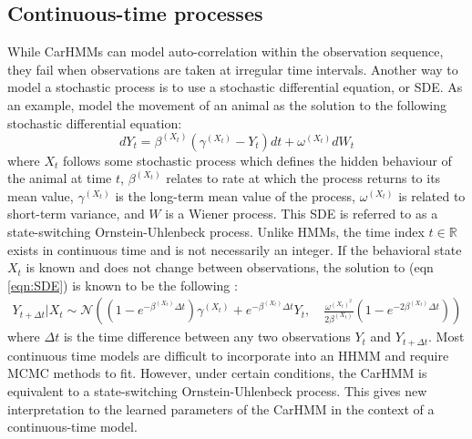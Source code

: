\subsection{Continuous-time processes}

While CarHMMs can model auto-correlation within the observation sequence, they fail when observations are taken at irregular time intervals. Another way to model a stochastic process is to use a stochastic differential equation, or SDE. As an example, \citep{Michelot:2019} model the movement of an animal as the solution to the following stochastic differential equation:
%
\begin{equation}
    \label{eqn:SDE}
    dY_t = \beta^{(X_t)}(\gamma^{(X_t)} - Y_t)dt + \omega^{(X_t)} dW_t
\end{equation}
%
where $X_t$ follows some stochastic process which defines the hidden behaviour of the animal at time $t$, $\beta^{(X_t)}$ relates to rate at which the process returns to its mean value, $\gamma^{(X_t)}$ is the long-term mean value of the process, $\omega^{(X_t)}$ is related to short-term variance, and $W$ is a Wiener process. This SDE is referred to as a state-switching Ornstein-Uhlenbeck process. Unlike HMMs, the time index $t \in \mathbb{R}$ exists in continuous time and is not necessarily an integer. If the behavioral state $X_t$ is known and does not change between observations, the solution to (eqn \ref{eqn:SDE}) is known to be the following \citep{Michelot:2019}:
%
\begin{align}
    Y_{t+\Delta t} | X_{t} \sim \mathcal{N}\left((1-e^{-\beta^{(X_t)}\Delta t})\gamma^{(X_t)} + e^{-\beta^{(X_t)}\Delta t} Y_t,\quad \frac{\omega^{(X_t)^2}}{2\beta^{(X_t)}} (1-e^{-2\beta^{(X_t)}\Delta t})\right)
    \label{eqn:OU_sol}
\end{align}
%
where $\Delta t$ is the time difference between any two observations $Y_t$ and $Y_{t+\Delta t}$. Most continuous time models are difficult to incorporate into an HHMM and require MCMC methods to fit. However, under certain conditions, the CarHMM is equivalent to a state-switching Ornstein-Uhlenbeck process. This gives new interpretation to the learned parameters of the CarHMM in the context of a continuous-time model.

